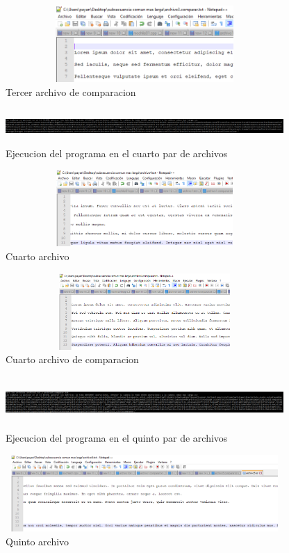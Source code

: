 \documentclass[spanish]{article}
\begin{document}
	\begin{figure}[H]
		\centering
		\includegraphics[width=400px,height=110px]{captura9}
		\caption{Tercer archivo de comparacion}
	\end{figure}
		\begin{figure}[H]
		\centering
		\includegraphics[width=400px,height=50px]{captura10}
		\caption{Ejecucion del programa en el cuarto par de archivos}
	\end{figure}
	\begin{figure}[H]
		\centering
		\includegraphics[width=400px,height=110px]{captura11}
		\caption{Cuarto archivo}
	\end{figure}
	\begin{figure}[H]
		\centering
		\includegraphics[width=400px,height=110px]{captura12}
		\caption{Cuarto archivo de comparacion}
	\end{figure}
		\begin{figure}[H]
		\centering
		\includegraphics[width=400px,height=75px]{captura13}
		\caption{Ejecucion del programa en el quinto par de archivos}
	\end{figure}
	\begin{figure}[H]
		\centering
		\includegraphics[width=400px,height=110px]{captura14}
		\caption{Quinto archivo}
	\end{figure}
\end{document}
